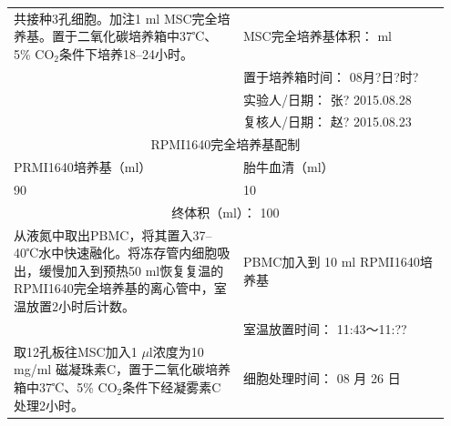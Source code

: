 \documentclass[UTF8,10pt,a4paper,fontset=fandol]{ctexart}
\newcommand{\fieldvalue}[1]{#1}
\newcommand{\handwritten}[1]{#1}
\begin{document}
\begin{tabular}{|p{0.50\linewidth}|p{0.45\linewidth}|}
\hline
共接种3孔细胞。加注1 ml MSC完全培养基。置于二氧化碳培养箱中37℃、5\% CO$_2$条件下培养18--24小时。&
MSC完全培养基体积：\underline{\hspace{1.2cm}} ml\\
&
置于培养箱时间：
\fieldvalue{\handwritten{08月?日?时?}}\\
&
实验人/日期：
\fieldvalue{\handwritten{张? 2015.08.28}}\\
&
复核人/日期：
\fieldvalue{\handwritten{赵? 2015.08.23}}\\
\hline
\multicolumn{2}{|c|}{RPMI1640完全培养基配制}\\
\hline
PRMI1640培养基（ml）&
胎牛血清（ml）\\
\fieldvalue{\handwritten{90}}&
\fieldvalue{\handwritten{10}}\\
\multicolumn{2}{|c|}{终体积（ml）：
\fieldvalue{\handwritten{100}}}\\
\hline
从液氮中取出PBMC，将其置入37--40℃水中快速融化。将冻存管内细胞吸出，缓慢加入到预热50 ml恢复复温的RPMI1640完全培养基的离心管中，室温放置2小时后计数。&
PBMC加入到%
\fieldvalue{\handwritten{10}} ml RPMI1640培养基\\
&室温放置时间：
\fieldvalue{\handwritten{11:43～11:??}}\\
\hline
取12孔板往MSC加入1 $\mu$l浓度为10 mg/ml 磁凝珠素C，置于二氧化碳培养箱中37℃、5\% CO$_2$条件下经凝雾素C处理2小时。&
细胞处理时间：
\fieldvalue{\handwritten{08}} 月
\fieldvalue{\handwritten{26}} 日

\end{tabular}
\end{document}
